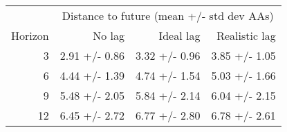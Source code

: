 
\begin{tabular*}{0.7\textwidth}{rrrr}
\toprule
          & \multicolumn{3}{c}{Distance to future (mean +/- std dev AAs)} \\
  Horizon & No lag & Ideal lag & Realistic lag \\
\midrule

3 & 2.91 +/- 0.86 & 3.32 +/- 0.96 & 3.85 +/- 1.05 \\
6 & 4.44 +/- 1.39 & 4.74 +/- 1.54 & 5.03 +/- 1.66 \\
9 & 5.48 +/- 2.05 & 5.84 +/- 2.14 & 6.04 +/- 2.15 \\
12 & 6.45 +/- 2.72 & 6.77 +/- 2.80 & 6.78 +/- 2.61 \\

\bottomrule
\end{tabular*}


